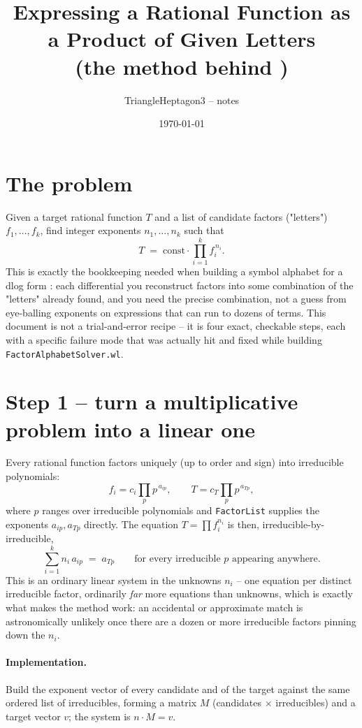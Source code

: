 \documentclass[11pt]{article}
\title{Expressing a Rational Function as a Product of Given Letters\\
\large (the method behind \code{SolveFactorPowers})}
\author{TriangleHeptagon3 -- \code{4DBasis} notes}
\date{\today}
\newcommand{\code}[1]{\texttt{#1}}
\begin{document}
\maketitle

\section{The problem}

Given a target rational function $T$ and a list of candidate factors ("letters") $f_1,\dots,f_k$, find integer exponents $n_1,\dots,n_k$ such that
\[
  T \;=\; \text{const}\cdot \prod_{i=1}^{k} f_i^{\,n_i}.
\]
This is exactly the bookkeeping needed when building a symbol alphabet for a dlog form \cite{GSVV2010,Duhr2014}: each differential you reconstruct factors into some combination of the "letters" already found, and you need the precise combination, not a guess from eye-balling exponents on expressions that can run to dozens of terms. This document is not a trial-and-error recipe -- it is four exact, checkable steps, each with a specific failure mode that was actually hit and fixed while building \code{FactorAlphabetSolver.wl}.

\section{Step 1 -- turn a multiplicative problem into a linear one}

Every rational function factors uniquely (up to order and sign) into irreducible polynomials:
\[
  f_i = c_i \prod_{p} p^{\,a_{ip}}, \qquad T = c_T \prod_p p^{\,a_{Tp}},
\]
where $p$ ranges over irreducible polynomials and \code{FactorList} supplies the exponents $a_{ip}, a_{Tp}$ directly. The equation $T=\prod f_i^{n_i}$ is then, irreducible-by-irreducible,
\[
  \sum_{i=1}^k n_i\, a_{ip} \;=\; a_{Tp} \qquad \text{for every irreducible } p \text{ appearing anywhere.}
\]
This is an ordinary linear system in the unknowns $n_i$ -- one equation per distinct irreducible factor, ordinarily \emph{far} more equations than unknowns, which is exactly what makes the method work: an accidental or approximate match is astronomically unlikely once there are a dozen or more irreducible factors pinning down the $n_i$.

\paragraph{Implementation.} Build the exponent vector of every candidate and of the target against the same ordered list of irreducibles, forming a matrix $M$ (candidates $\times$ irreducibles) and a target vector $v$; the system is $n \cdot M = v$.
\end{document}
